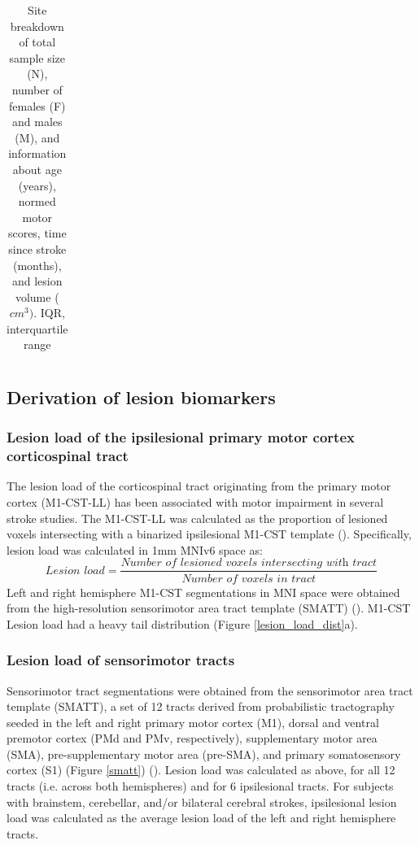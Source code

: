 \documentclass[10pt]{article}
\begin{document}
\begin{table}[h]
\begin{tabular}{llllll}
\bottomrule
\end{tabular}
\caption*{Site breakdown of total sample size (N), number of females (F) and males (M), and information about age (years), normed motor scores, time since stroke (months), and lesion volume ($cm^3)$. IQR, interquartile range}
\end{table}




\subsection{Derivation of lesion biomarkers}
\subsubsection*{Lesion load of the ipsilesional primary motor cortex corticospinal tract}
The lesion load of the corticospinal tract originating from the primary motor cortex (M1-CST-LL) has been associated with motor impairment in several stroke studies. The M1-CST-LL was calculated as the proportion of lesioned voxels intersecting with a binarized ipsilesional M1-CST template (\cite{Zhu2010-qh}). Specifically, lesion load was calculated in 1mm MNIv6 space as:
\begin{equation}
    \textit{Lesion load} = \frac{\textit{Number of lesioned voxels intersecting with  tract}}{\textit{Number of voxels in tract}}
\end{equation}
Left and right hemisphere M1-CST segmentations in MNI space were obtained from the high-resolution sensorimotor area tract template (SMATT) (\cite{Archer2018-ti}). M1-CST Lesion load had a heavy tail distribution (Figure \ref{lesion_load_dist}a).
 
\subsubsection*{Lesion load of sensorimotor tracts}
Sensorimotor tract segmentations were obtained from the sensorimotor area tract template (SMATT), a set of 12 tracts derived from probabilistic tractography seeded in the left and right primary motor cortex (M1), dorsal and ventral premotor cortex (PMd and PMv, respectively), supplementary motor area (SMA), pre-supplementary motor area (pre-SMA), and primary somatosensory cortex (S1) (Figure \ref{smatt}) (\cite{Archer2018-ti}). Lesion load was calculated as above, for all 12 tracts (i.e. across both hemispheres) and for 6 ipsilesional tracts. For subjects with brainstem, cerebellar, and/or bilateral cerebral strokes, ipsilesional lesion load was calculated as the average lesion load of the left and right hemisphere tracts.
\end{document}
